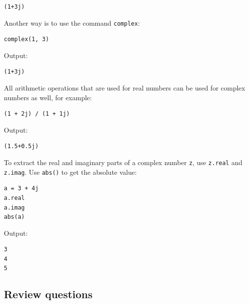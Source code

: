 \documentclass[article,A4,12pt]{llncs}
\begin{document}
\begin{verbatim}
(1+3j)
\end{verbatim}
Another way is to use the command {\tt complex}:

\begin{verbatim}
complex(1, 3)
\end{verbatim}
Output:

\begin{verbatim}
(1+3j)
\end{verbatim}
All arithmetic operations that are used for real numbers can be 
used for complex numbers as well, for example:

\begin{verbatim}
(1 + 2j) / (1 + 1j)
\end{verbatim}
Output:

\begin{verbatim}
(1.5+0.5j)
\end{verbatim}
To extract the real and imaginary parts of a complex number {\tt z}, use {\tt z.real}
and {\tt z.imag}. Use {\tt abs()} to get the absolute value:

\begin{verbatim}
a = 3 + 4j
a.real
a.imag
abs(a)
\end{verbatim}
Output:

\begin{verbatim}
3
4
5
\end{verbatim}

\subsection{Review questions}
\end{document}

